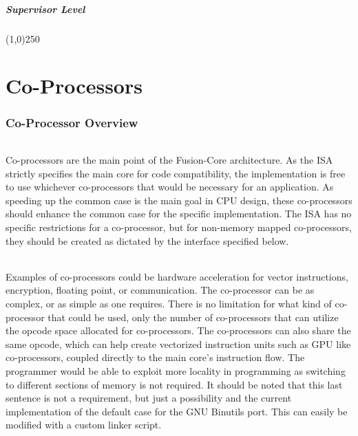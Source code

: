 \documentclass[letterpaper, 11pt]{article}
\begin{document}
\subsubsection{Supervisor Level}

\begin{center}
	\line(1,0){250}
\end{center}

\clearpage
\part{Co-Processors}
\section{Co-Processor Overview}
\paragraph{}Co-processors are the main point of the Fusion-Core architecture. As the ISA strictly specifies the main core for code compatibility,
the implementation is free to use whichever co-processors that would be necessary for an application. As speeding up the common case is the main goal in CPU design,
these co-processors should enhance the common case for the specific implementation. The ISA has no specific restrictions for a co-processor, but for non-memory
mapped co-processors, they should be created as dictated by the interface specified below.

\paragraph{} Examples of co-processors could be hardware acceleration for vector instructions, encryption, floating point, or communication.
The co-processor can be as complex, or as simple as one requires. There is no limitation for what kind of co-processor that could be used, 
only the number of co-processors that can utilize the opcode space allocated for co-processors. The co-processors can also share the same opcode, which
can help create vectorized instruction units such as GPU like co-processors, coupled directly to the main core's instruction flow. The programmer would
be able to exploit more locality in programming as switching to different sections of memory is not required. It should be noted that this last sentence is
not a requirement, but just a possibility and the current implementation of the default case for the GNU Binutils port. This can easily be modified with a 
custom linker script.
\end{document}
